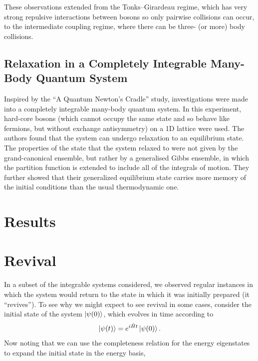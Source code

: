 \documentclass[a4paper,10pt]{article}
\begin{document}
These observations extended from the Tonks–Girardeau regime, which has very strong repulsive interactions between bosons so only pairwise collisions can occur, to the intermediate 
coupling regime, where there can be three- (or more) body collisions. 

\subsection{Relaxation in a Completely Integrable Many-Body Quantum System \cite{Rigol2007}}

Inspired by the ``A Quantum Newton's Cradle'' study, investigations were made into a completely integrable many-body quantum system. In this experiment, hard-core bosons (which cannot
occupy the same state and so behave like fermions, but without exchange antisymmetry) on a 1D lattice were used. The authors found that the system can undergo relaxation to an equilibrium 
state. The properties of the state that the system relaxed to were not given by the grand-canonical ensemble, but rather by a generalised Gibbs ensemble, in which the partition function 
is extended to include all of the integrals of motion. They further showed that their generalized equilibrium state carries more memory of the initial conditions than the usual thermodynamic one.





\section{Results}


\section{Revival}
In a subset of the integrable systems considered, we observed regular instances in which the system would return to the state in which it was initially prepared (it ``revives''). 
To see why we might expect to see revival in some cases, consider the initial state of the system $\ket{\psi(0)}$, which evolves in time according to
\begin{equation}
 \ket{\psi(t)}=e^{i\hat{H}t}\ket{\psi(0)}.
\end{equation}
Now noting that we can use the completeness relation for the energy eigenstates to expand the initial state in the energy basis,
\end{document}
